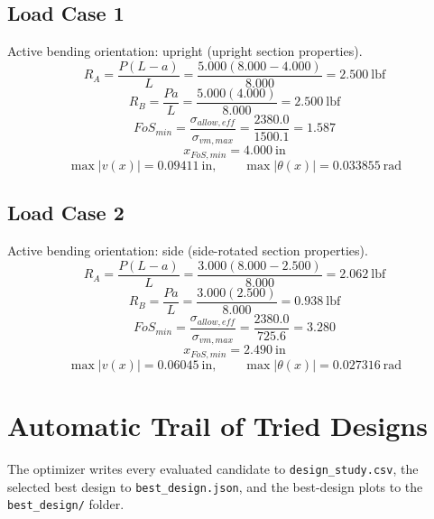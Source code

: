 \documentclass[11pt]{article}
\begin{document}
\subsection*{Load Case 1}
Active bending orientation: upright (upright section properties).
\[R_A = \frac{P(L-a)}{L} = \frac{5.000(8.000-4.000)}{8.000} = 2.500\ \mathrm{lbf}\]
\[R_B = \frac{Pa}{L} = \frac{5.000(4.000)}{8.000} = 2.500\ \mathrm{lbf}\]
\[FoS_{min} = \frac{\sigma_{allow,eff}}{\sigma_{vm,max}} = \frac{2380.0}{1500.1} = 1.587\]
\[x_{FoS,min} = 4.000\ \mathrm{in}\]
\[\max |v(x)| = 0.09411\ \mathrm{in}, \qquad \max |\theta(x)| = 0.033855\ \mathrm{rad}\]
\subsection*{Load Case 2}
Active bending orientation: side (side-rotated section properties).
\[R_A = \frac{P(L-a)}{L} = \frac{3.000(8.000-2.500)}{8.000} = 2.062\ \mathrm{lbf}\]
\[R_B = \frac{Pa}{L} = \frac{3.000(2.500)}{8.000} = 0.938\ \mathrm{lbf}\]
\[FoS_{min} = \frac{\sigma_{allow,eff}}{\sigma_{vm,max}} = \frac{2380.0}{725.6} = 3.280\]
\[x_{FoS,min} = 2.490\ \mathrm{in}\]
\[\max |v(x)| = 0.06045\ \mathrm{in}, \qquad \max |\theta(x)| = 0.027316\ \mathrm{rad}\]

\section*{Automatic Trail of Tried Designs}
The optimizer writes every evaluated candidate to \texttt{design\_study.csv}, the selected best design to \texttt{best\_design.json}, and the best-design plots to the \texttt{best\_design/} folder.
\end{document}
